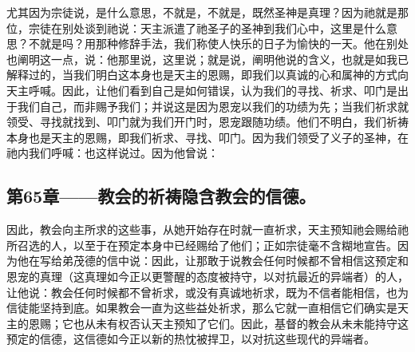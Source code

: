 尤其因为宗徒说，是什么意思，不就是，不就是，既然圣神是真理？因为祂就是那位，宗徒在别处谈到祂说：天主派遣了祂圣子的圣神到我们心中，这里是什么意思？不就是吗？用那种修辞手法，我们称使人快乐的日子为愉快的一天。他在别处也阐明这一点，说：他那里说，这里说；就是说，阐明他说的含义，也就是如我已解释过的，当我们明白这本身也是天主的恩赐，即我们以真诚的心和属神的方式向天主呼喊。因此，让他们看到自己是如何错误，认为我们的寻找、祈求、叩门是出于我们自己，而非赐予我们；并说这是因为恩宠以我们的功绩为先；当我们祈求就领受、寻找就找到、叩门就为我们开门时，恩宠跟随功绩。他们不明白，我们祈祷本身也是天主的恩赐，即我们祈求、寻找、叩门。因为我们领受了义子的圣神，在祂内我们呼喊：也这样说过。因为他曾说：\par


\subsection{第65章——教会的祈祷隐含教会的信德。}

因此，教会向主所求的这些事，从她开始存在时就一直祈求，天主预知祂会赐给祂所召选的人，以至于在预定本身中已经赐给了他们；正如宗徒毫不含糊地宣告。因为他在写给弟茂德的信中说：因此，让那敢于说教会任何时候都不曾相信这预定和恩宠的真理（这真理如今正以更警醒的态度被持守，以对抗最近的异端者）的人，让他说：教会任何时候都不曾祈求，或没有真诚地祈求，既为不信者能相信，也为信徒能坚持到底。如果教会一直为这些益处祈求，那么它就一直相信它们确实是天主的恩赐；它也从未有权否认天主预知了它们。因此，基督的教会从未未能持守这预定的信德，这信德如今正以新的热忱被捍卫，以对抗这些现代的异端者。\par

